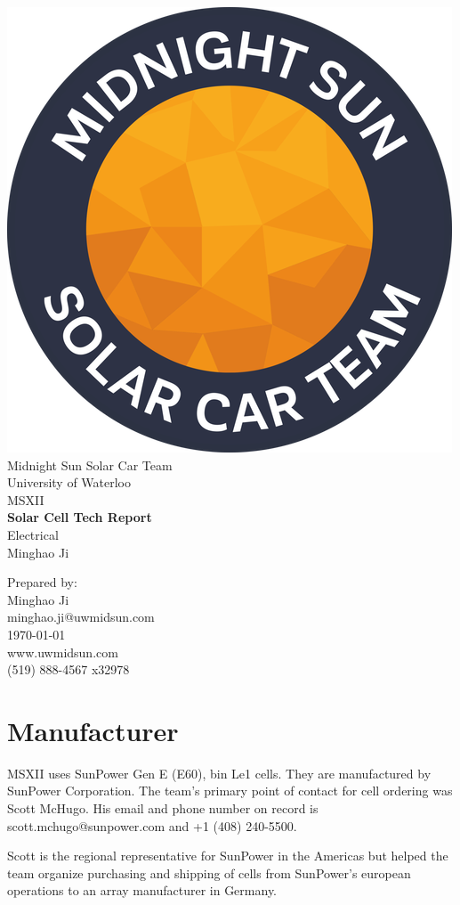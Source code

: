 \documentclass[10pt]{article}
\makeatletter
\newcommand\theteamname{Midnight Sun Solar Car Team} %
\newcommand\theuniversityname{University of Waterloo} %
\newcommand\theteamwebsite{www.uwmidsun.com} %
\newcommand\theteamphone{(519) 888-4567 x32978} %
\newcommand\thetitle{Solar Cell Tech Report} %
\newcommand\thesubtitle{Electrical} %
\newcommand\theauthor{Minghao Ji} %
\newcommand\theauthorcontact{minghao.ji@uwmidsun.com} %
\newcommand\thedate{\today} %
\makeatother
\begin{document}
\begin{titlepage}
\large
\vspace*{2cm}
\centering
\includegraphics[width=.25\textwidth]{./figures/midnightSunLogoCircle.png} \\
\vspace{1.5cm}
{\LARGE \theteamname} \\
\theuniversityname \\
\vspace{2.2cm}
{\LARGE MSXII} \\
\vspace{0.4cm}
{\huge\bfseries \thetitle} \\
\vspace{0.2cm}
{\LARGE \thesubtitle} \\
\vspace{2.2cm}
\ifdefined \theauthor
\par Prepared by: \\
\theauthor \\
\theauthorcontact \\
\fi
\thedate \\
\vfill
\theteamwebsite \\
\theteamphone
\end{titlepage}

\tableofcontents
\listoffigures %

\section{Manufacturer}
MSXII uses SunPower Gen E (E60), bin Le1 cells. They are manufactured by SunPower Corporation. The team's primary point of contact for cell ordering was Scott McHugo. His email and phone number on record is scott.mchugo@sunpower.com and +1 (408) 240-5500.

Scott is the regional representative for SunPower in the Americas but helped the team organize purchasing and shipping of cells from SunPower's european operations to an array manufacturer in Germany.
\end{document}
